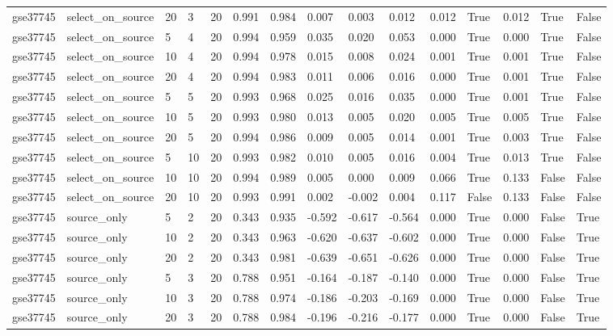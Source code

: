 \begin{table}[t]
\begin{tabular}{lllllllllllllll}
    gse37745 & select\_on\_source & 20 & 3 & 20 & 0.991 & 0.984 & 0.007 & 0.003 & 0.012 & 0.012 & True & 0.012 & True & False \\
    gse37745 & select\_on\_source & 5 & 4 & 20 & 0.994 & 0.959 & 0.035 & 0.020 & 0.053 & 0.000 & True & 0.000 & True & False \\
    gse37745 & select\_on\_source & 10 & 4 & 20 & 0.994 & 0.978 & 0.015 & 0.008 & 0.024 & 0.001 & True & 0.001 & True & False \\
    gse37745 & select\_on\_source & 20 & 4 & 20 & 0.994 & 0.983 & 0.011 & 0.006 & 0.016 & 0.000 & True & 0.001 & True & False \\
    gse37745 & select\_on\_source & 5 & 5 & 20 & 0.993 & 0.968 & 0.025 & 0.016 & 0.035 & 0.000 & True & 0.001 & True & False \\
    gse37745 & select\_on\_source & 10 & 5 & 20 & 0.993 & 0.980 & 0.013 & 0.005 & 0.020 & 0.005 & True & 0.005 & True & False \\
    gse37745 & select\_on\_source & 20 & 5 & 20 & 0.994 & 0.986 & 0.009 & 0.005 & 0.014 & 0.001 & True & 0.003 & True & False \\
    gse37745 & select\_on\_source & 5 & 10 & 20 & 0.993 & 0.982 & 0.010 & 0.005 & 0.016 & 0.004 & True & 0.013 & True & False \\
    gse37745 & select\_on\_source & 10 & 10 & 20 & 0.994 & 0.989 & 0.005 & 0.000 & 0.009 & 0.066 & True & 0.133 & False & False \\
    gse37745 & select\_on\_source & 20 & 10 & 20 & 0.993 & 0.991 & 0.002 & -0.002 & 0.004 & 0.117 & False & 0.133 & False & False \\
    gse37745 & source\_only & 5 & 2 & 20 & 0.343 & 0.935 & -0.592 & -0.617 & -0.564 & 0.000 & True & 0.000 & False & True \\
    gse37745 & source\_only & 10 & 2 & 20 & 0.343 & 0.963 & -0.620 & -0.637 & -0.602 & 0.000 & True & 0.000 & False & True \\
    gse37745 & source\_only & 20 & 2 & 20 & 0.343 & 0.981 & -0.639 & -0.651 & -0.626 & 0.000 & True & 0.000 & False & True \\
    gse37745 & source\_only & 5 & 3 & 20 & 0.788 & 0.951 & -0.164 & -0.187 & -0.140 & 0.000 & True & 0.000 & False & True \\
    gse37745 & source\_only & 10 & 3 & 20 & 0.788 & 0.974 & -0.186 & -0.203 & -0.169 & 0.000 & True & 0.000 & False & True \\
    gse37745 & source\_only & 20 & 3 & 20 & 0.788 & 0.984 & -0.196 & -0.216 & -0.177 & 0.000 & True & 0.000 & False & True \\

\end{tabular}
\end{table}

